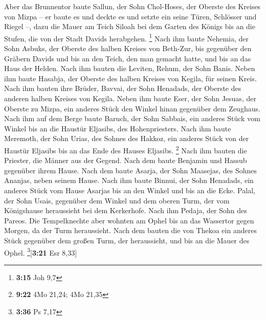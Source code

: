  Aber das Brunnentor baute Sallun, der Sohn Chol-Hoses,
der Oberste des Kreises von Mizpa -- er baute es und deckte es und
setzte ein seine Türen, Schlösser und Riegel --, dazu die Mauer am Teich
Siloah bei dem Garten des Königs bis an die Stufen, die von der Stadt
Davids herabgehen. \footnote{\textbf{3:15} Joh 9,7}  Nach
ihm baute Nehemia, der Sohn Asbuks, der Oberste des halben Kreises von
Beth-Zur, bis gegenüber den Gräbern Davids und bis an den Teich, den man
gemacht hatte, und bis an das Haus der Helden.  Nach ihm
bauten die Leviten, Rehum, der Sohn Banis. Neben ihm baute Hasabja, der
Oberste des halben Kreises von Kegila, für seinen Kreis. 
Nach ihm bauten ihre Brüder, Bavvai, der Sohn Henadads, der Oberste des
anderen halben Kreises von Kegila.  Neben ihm baute Eser,
der Sohn Jesuas, der Oberste zu Mizpa, ein anderes Stück den Winkel
hinan gegenüber dem Zeughaus.  Nach ihm auf dem Berge
baute Baruch, der Sohn Sabbais, ein anderes Stück vom Winkel bis an die
Haustür Eljasibs, des Hohenpriesters.  Nach ihm baute
Meremoth, der Sohn Urias, des Sohnes des Hakkoz, ein anderes Stück von
der Haustür Eljasibs bis an das Ende des Hauses Eljasibs. \footnote{\textbf{9:22}
  4Mo 21,24; 4Mo 21,35}  Nach ihm bauten die Priester,
die Männer aus der Gegend.  Nach dem baute Benjamin und
Hassub gegenüber ihrem Hause. Nach dem baute Asarja, der Sohn Maasejas,
des Sohnes Ananjas, neben seinem Hause.  Nach ihm baute
Binnui, der Sohn Henadads, ein anderes Stück vom Hause Asarjas bis an
den Winkel und bis an die Ecke.  Palal, der Sohn Usais,
gegenüber dem Winkel und dem oberen Turm, der vom Königshause
heraussieht bei dem Kerkerhofe. Nach ihm Pedaja, der Sohn des Pareos.
 Die Tempelknechte aber wohnten am Ophel bis an das
Wassertor gegen Morgen, da der Turm heraussieht.  Nach
dem bauten die von Thekoa ein anderes Stück gegenüber dem großen Turm,
der heraussieht, und bis an die Mauer des Ophel.
\footnote{\textbf{3:36} Ps 7,17}{[}\textbf{3:21} Esr 8,33{]}

